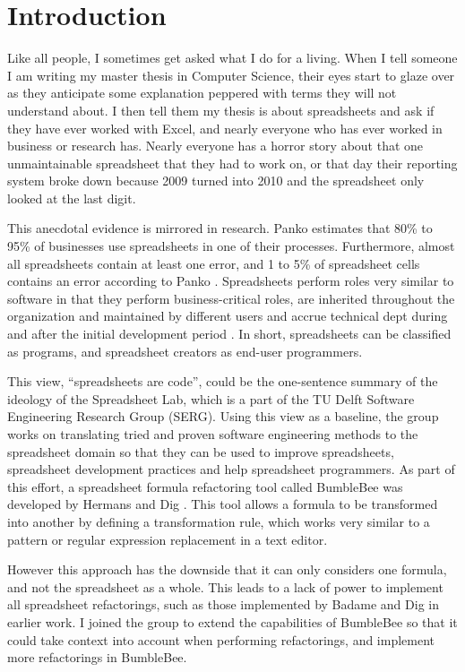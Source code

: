 \chapter{Introduction}
\label{chapter:introduction}

Like all people, I sometimes get asked what I do for a living.
When I tell someone I am writing my master thesis in Computer Science, their eyes start to glaze over as they anticipate some explanation peppered with terms they will not understand about.
I then tell them my thesis is about spreadsheets and ask if they have ever worked with Excel, and nearly everyone who has ever worked in business or research has.
Nearly everyone has a horror story about that one unmaintainable spreadsheet that they had to work on, or that day their reporting system broke down because 2009 turned into 2010 and the spreadsheet only looked at the last digit.

This anecdotal evidence is mirrored in research.
Panko \cite{panko2006facing} estimates that 80\% to 95\% of businesses use spreadsheets in one of their processes.
Furthermore, almost all spreadsheets contain at least one error, and 1 to 5\% of spreadsheet cells contains an error according to Panko \cite{panko1998we}.
Spreadsheets perform roles very similar to software in that they perform business-critical roles, are inherited throughout the organization and maintained by different users and accrue technical dept during and after the initial development period \cite{panko1998we}.
In short, spreadsheets can be classified as programs, and spreadsheet creators as end-user programmers.

This view, ``spreadsheets are code'', could be the one-sentence summary of the ideology of the Spreadsheet Lab, which is a part of the TU Delft Software Engineering Research Group (SERG).
Using this view as a baseline, the group works on translating tried and proven software engineering methods to the spreadsheet domain so that they can be used to improve spreadsheets, spreadsheet development practices and help spreadsheet programmers.
As part of this effort, a spreadsheet formula refactoring tool called BumbleBee was developed by Hermans and Dig \cite{hermans2014bumblebee}.
This tool allows a formula to be transformed into another by defining a transformation rule, which works very similar to a pattern or regular expression replacement in a text editor.

However this approach has the downside that it can only considers one formula, and not the spreadsheet as a whole.
This leads to a lack of power to implement all spreadsheet refactorings, such as those implemented by Badame and Dig \cite{badame2012refactoring} in earlier work.
I joined the group to extend the capabilities of BumbleBee so that it could take context into account when performing refactorings, and implement more refactorings in BumbleBee.

